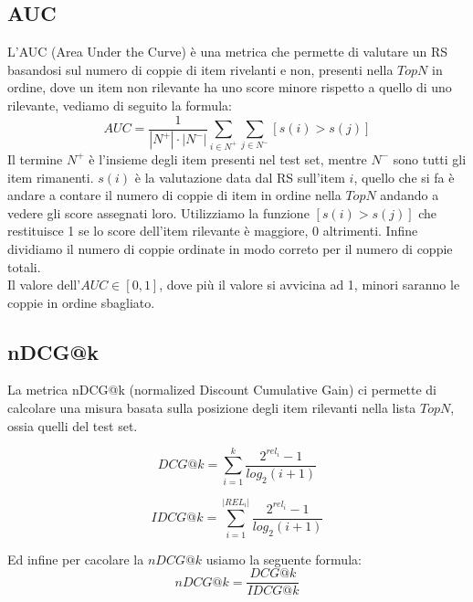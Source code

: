 \subsection{AUC}
L'AUC (Area Under the Curve) è una metrica che permette di valutare un RS basandosi sul numero di coppie di item rivelanti e non, presenti nella $TopN$ in ordine, dove un item non rilevante ha uno score minore rispetto a quello di uno rilevante, vediamo di seguito la formula:
$$AUC = \frac{1}{|N^{+}|\cdot|N^{-}|}\sum_{i \in N^{+}} \sum_{j \in N^{-}} [s(i) > s(j)]$$
Il termine $N^{+}$ è l'insieme degli item presenti nel test set, mentre $N^{-}$ sono tutti gli item rimanenti. $s(i)$ è la valutazione data dal RS sull'item $i$, quello che si fa è andare a contare il numero di coppie di item in ordine nella $TopN$ andando a vedere gli score assegnati loro.
Utilizziamo la funzione $[s(i) > s(j)]$ che restituisce 1 se lo score dell'item rilevante è maggiore, 0 altrimenti. Infine dividiamo il numero di coppie ordinate in modo correto per il numero di coppie totali.\\
Il valore dell'$AUC \in [0,1]$, dove più il valore si avvicina ad 1, minori saranno le coppie in ordine sbagliato.

\subsection{nDCG@k}
La metrica nDCG@k (normalized Discount Cumulative Gain) ci permette di calcolare una misura basata sulla posizione degli item rilevanti nella lista $TopN$, ossia quelli del test set.

\begin{minipage}[H]{0.5\textwidth}
	$$DCG@k = \sum_{i=1}^{k} \frac{2^{rel_i} - 1}{log_{2} (i + 1)}$$
\end{minipage}
\begin{minipage}[H]{0.5\textwidth}
	$$IDCG@k = \sum_{i=1}^{|REL_i|} \frac{2^{rel_i} - 1}{log_{2} (i + 1)}$$
\end{minipage}
\newline

Ed infine per cacolare la $nDCG@k$ usiamo la seguente formula:
$$nDCG@k = \frac{DCG@k}{IDCG@k}$$

